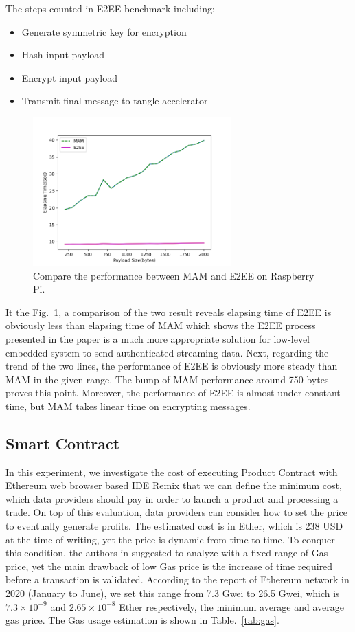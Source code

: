 \documentclass[conference]{IEEEtran}
\begin{document}
The steps counted in E2EE benchmark including:
\begin{itemize}
	\item Generate symmetric key for encryption
	\item Hash input payload
	\item Encrypt input payload
	\item Transmit final message to tangle-accelerator
\end{itemize}

\begin{figure}[!t]
    \centering
    \includegraphics[width=3in]{mam_vs_e2ee}
    \caption{Compare the performance between MAM and E2EE on Raspberry Pi.}
    \label{fig:mam_vs_e2ee}
\end{figure}

It the Fig.~\ref{fig:mam_vs_e2ee}, a comparison of the two result reveals elapsing time of E2EE is obviously less than elapsing time of MAM which shows the E2EE process presented in the paper is a much more appropriate solution for low-level embedded system to send authenticated streaming data. Next, regarding the trend of the two lines, the performance of E2EE is obviously more steady than MAM in the given range. The bump of MAM performance around 750 bytes proves this point. Moreover, the performance of E2EE is almost under constant time, but MAM takes linear time on encrypting messages.

\subsection{Smart Contract}
In this experiment, we investigate the cost of executing Product Contract with Ethereum web browser based IDE Remix that we can define the minimum cost, which data providers should pay in order to launch a product and processing a trade.  On top of this evaluation, data providers can consider how to set the price to eventually generate profits. The estimated cost is in Ether, which is 238 USD at the time of writing, yet the price is dynamic from time to time. To conquer this condition, the authors in \cite{MindMyValue} suggested to analyze with a fixed range of Gas price,  yet the main drawback of low Gas price is the increase of time required before a transaction is validated. According to the report of Ethereum network\cite{ethereumChart} in 2020 (January to June), we set this range from 7.3 Gwei to 26.5 Gwei, which is $7.3 \times 10^{-9}$ and $2.65 \times 10^{-8}$ Ether respectively, the minimum average and average gas price. The Gas usage estimation is shown in Table.~\ref{tab:gas}.
\end{document}
